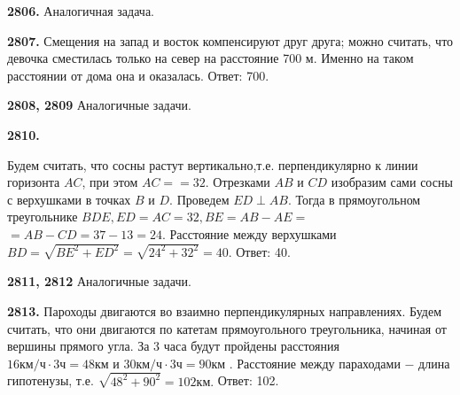\textbf{2806.} Аналогичная задача.

\textbf{2807.} Смещения на запад и восток компенсируют друг друга; можно считать, что девочка сместилась только на север на расстояние 700 м. Именно на таком расстоянии от дома она и оказалась.   \newline \null \hspace*{\fill} Ответ: 700. 

\textbf{2808, 2809} Аналогичные задачи.

\textbf{2810.}
\begin{figure}[h]
\end{figure}
Будем считать, что сосны растут вертикально,\newline т.е. перпендикулярно к линии горизонта $AC$, при этом $AC=$\newline$=32.$ Отрезками $AB$ и $CD$ изобразим сами сосны с верхушками в точках $B$ и $D$. Проведем $ED\perp AB$. Тогда в прямоугольном треугольнике $BDE, ED=AC=32, BE=AB-AE=$\newline$=AB-CD=37-13=24.$ Расстояние между верхушками $BD=\sqrt{BE^2 + ED^2}=\sqrt{24^2+32^2}=40.$ \newline \null \hspace*{\fill} Ответ: 40. 

\textbf{2811, 2812} Аналогичные задачи.

\textbf{2813.} Пароходы двигаются во взаимно перпендикулярных направлениях. Будем считать, что они двигаются по катетам прямоугольного треугольника, начиная от вершины прямого угла. За 3 часа будут пройдены расстояния $16\text{км/ч}\cdot3\text{ч}=48\text{км и }$\newline$30\text{км/ч}\cdot3\text{ч}=90\text{км .} $ Расстояние между параходами $-$ длина гипотенузы, т.е. $\sqrt{48^2+90^2}=102\text{км.}$ \newline \null \hspace*{\fill} Ответ: 102. 

